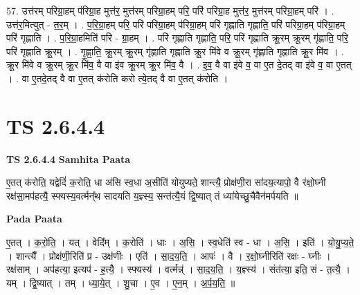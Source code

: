 \documentclass[17pt]{extarticle}
\begin{document}
57. उत्त॑रम् परिग्रा॒हम् प॑रिग्रा॒ह मुत्त॑र॒ मुत्त॑रम् परिग्रा॒हम् परि॒ परि॑ परिग्रा॒ह मुत्त॑र॒ मुत्त॑रम् परिग्रा॒हम् परि॑ । . उत्त॑र॒मित्युत् - त॒र॒म् । . प॒रि॒ग्रा॒हम् परि॒ परि॑ परिग्रा॒हम् प॑रिग्रा॒हम् परि॑ गृह्णाति गृह्णाति॒ परि॑ परिग्रा॒हम् प॑रिग्रा॒हम् परि॑ गृह्णाति । . प॒रि॒ग्रा॒हमिति॑ परि - ग्रा॒हम् । . परि॑ गृह्णाति गृह्णाति॒ परि॒ परि॑ गृह्णाति क्रू॒रम् क्रू॒रम् गृ॑ह्णाति॒ परि॒ परि॑ गृह्णाति क्रू॒रम् । . गृ॒ह्णा॒ति॒ क्रू॒रम् क्रू॒रम् गृ॑ह्णाति गृह्णाति क्रू॒र मि॑वे व क्रू॒रम् गृ॑ह्णाति गृह्णाति क्रू॒र मि॑व । . क्रू॒र मि॑वे व क्रू॒रम् क्रू॒र मि॑व॒ वै वा इ॑व क्रू॒रम् क्रू॒र मि॑व॒ वै । . इ॒व॒ वै वा इ॑वे व॒ वा ए॒त दे॒तद् वा इ॑वे व॒ वा ए॒तत् । . वा ए॒तदे॒तद् वै वा ए॒तत् क॑रोति करो त्ये॒तद् वै वा ए॒तत् क॑रोति । \newline
\pagebreak
{}
\section*{ TS 2.6.4.4 }

\textbf{TS 2.6.4.4 } \newline
\textbf{Samhita Paata} \newline

ए॒तत् क॑रोति॒ यद्वेदिं॑ क॒रोति॒ धा अ॑सि स्व॒धा अ॒सीति॑ योयुप्यते॒ शान्त्यै॒ प्रोक्ष॑णी॒रा सा॑दय॒त्यापो॒ वै र॑क्षो॒घ्नी रक्ष॑सा॒मप॑हत्यै॒ स्फ्यस्य॒वर्त्मन्᳚थ सादयति य॒ज्ञ्स्य॒ सन्त॑त्यै॒यं द्वि॒ष्यात् तं ध्या॑येच्छु॒चैवैन॑मर्पयति ॥ \newline

\textbf{Pada Paata} \newline

ए॒तत् । क॒रो॒ति॒ । यत् । वेदि᳚म् । क॒रोति॑ । धाः । अ॒सि॒ । स्व॒धेति॑ स्व - धा । अ॒सि॒ । इति॑ । यो॒यु॒प्य॒ते॒ । शान्त्यै᳚ । प्रोक्ष॑णी॒रिति॑ प्र - उक्ष॑णीः । एति॑ । सा॒द॒य॒ति॒ । आपः॑ । वै । र॒क्षो॒घ्नीरिति॑ रक्षः - घ्नीः । रक्ष॑साम् । अप॑हत्या॒ इत्यप॑ - ह॒त्यै॒ । स्फ्यस्य॑ । वर्त्मन्न्॑ । सा॒द॒य॒ति॒ । य॒ज्ञ्स्य॑ । संत॑त्या॒ इति॒ सं - त॒त्यै॒ । यम् । द्वि॒ष्यात् । तम् । ध्या॒ये॒त् । शु॒चा । ए॒व । ए॒न॒म् । अ॒र्प॒य॒ति॒ ॥  \newline
\end{document}
